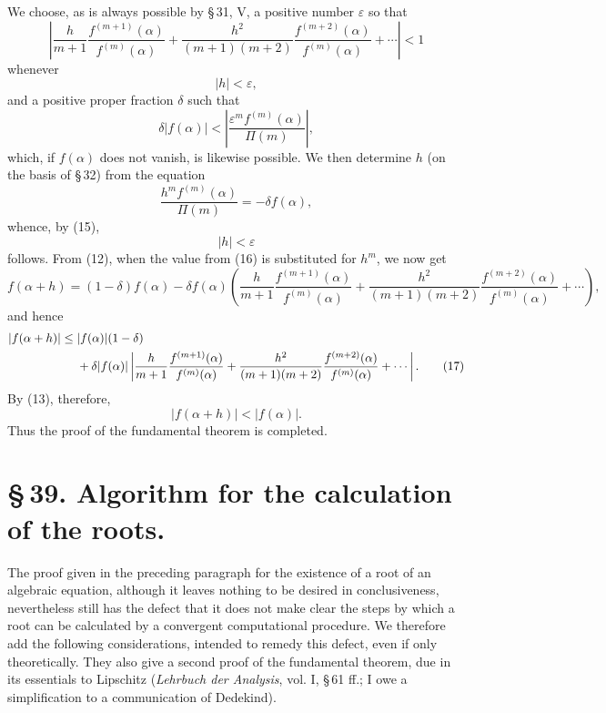 \documentclass[11pt]{article}
\begin{document}
We choose, as is always possible by \S\,31, V, a positive number $\varepsilon$ so that
\begin{equation}
\left|\frac{h}{m+1}\frac{f^{(m+1)}(\alpha)}{f^{(m)}(\alpha)}
+\frac{h^2}{(m+1)(m+2)}\frac{f^{(m+2)}(\alpha)}{f^{(m)}(\alpha)}+\cdots\right|<1
\tag{13}
\end{equation}
whenever
\begin{equation}
 |h|<\varepsilon,
\tag{14}
\end{equation}
and a positive proper fraction $\delta$ such that
\begin{equation}
 \delta |f(\alpha)|<\left|\frac{\varepsilon^m f^{(m)}(\alpha)}{\Pi(m)}\right|,
\tag{15}
\end{equation}
which, if $f(\alpha)$ does not vanish, is likewise possible. We then determine $h$ (on the basis of \S\,32) from the equation
\begin{equation}
 \frac{h^m f^{(m)}(\alpha)}{\Pi(m)}=-\delta f(\alpha),
\tag{16}
\end{equation}
whence, by (15),
\[
 |h|<\varepsilon
\]
follows. From (12), when the value from (16) is substituted for $h^m$, we now get
\[
 f(\alpha+h)=(1-\delta)f(\alpha)
 -\delta f(\alpha)\left(\frac{h}{m+1}\frac{f^{(m+1)}(\alpha)}{f^{(m)}(\alpha)}
 +\frac{h^2}{(m+1)(m+2)}\frac{f^{(m+2)}(\alpha)}{f^{(m)}(\alpha)}+\cdots\right),
\]
and hence
\begin{align}
 |f(\alpha+h)|\le{}& |f(\alpha)|(1-\delta)\notag\\
 &+\delta |f(\alpha)|\left|\frac{h}{m+1}\frac{f^{(m+1)}(\alpha)}{f^{(m)}(\alpha)}
 +\frac{h^2}{(m+1)(m+2)}\frac{f^{(m+2)}(\alpha)}{f^{(m)}(\alpha)}+\cdots\right|.
\tag{17}
\end{align}
By (13), therefore,
\begin{equation}
 |f(\alpha+h)|<|f(\alpha)|.\tag{18}
\end{equation}
Thus the proof of the fundamental theorem is completed.


\section*{\S\,39. Algorithm for the calculation of the roots.}

The proof given in the preceding paragraph for the existence of a root of an algebraic equation, although it leaves nothing to be desired in conclusiveness, nevertheless still has the defect that it does not make clear the steps by which a root can be calculated by a convergent computational procedure. We therefore add the following considerations, intended to remedy this defect, even if only theoretically. They also give a second proof of the fundamental theorem, due in its essentials to Lipschitz (\emph{Lehrbuch der Analysis}, vol. I, \S\,61 ff.; I owe a simplification to a communication of Dedekind).
\end{document}
